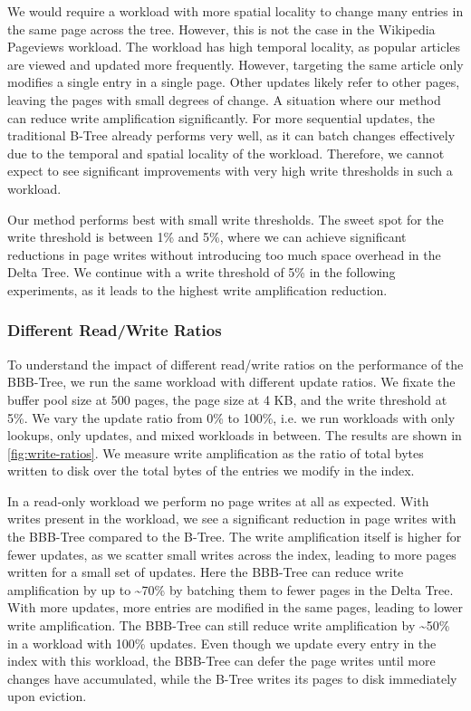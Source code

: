 We would require a workload with more spatial locality to change many entries in the same page across the tree.
However, this is not the case in the Wikipedia Pageviews workload.
The workload has high temporal locality, as popular articles are viewed and updated more frequently.
However, targeting the same article only modifies a single entry in a single page. 
Other updates likely refer to other pages, leaving the pages with small degrees of change.
A situation where our method can reduce write amplification significantly.
For more sequential updates, the traditional B-Tree already performs very well, as it can batch changes effectively due to the temporal and spatial locality of the workload.
Therefore, we cannot expect to see significant improvements with very high write thresholds in such a workload.

Our method performs best with small write thresholds.
The sweet spot for the write threshold is between 1\% and 5\%, where we can achieve significant reductions in page writes without introducing too much space overhead in the Delta Tree.
We continue with a write threshold of 5\% in the following experiments, as it leads to the highest write amplification reduction.

\subsubsection*{Different Read/Write Ratios}
To understand the impact of different read/write ratios on the performance of the BBB-Tree, we run the same workload with different update ratios.
We fixate the buffer pool size at 500 pages, the page size at 4 KB, and the write threshold at 5\%.
We vary the update ratio from 0\% to 100\%, i.e. we run workloads with only lookups, only updates, and mixed workloads in between.
The results are shown in \autoref{fig:write-ratios}.
We measure write amplification as the ratio of total bytes written to disk over the total bytes of the entries we modify in the index.

In a read-only workload we perform no page writes at all as expected.
With writes present in the workload, we see a significant reduction in page writes with the BBB-Tree compared to the B-Tree.
The write amplification itself is higher for fewer updates, as we scatter small writes across the index, leading to more pages written for a small set of updates.
Here the BBB-Tree can reduce write amplification by up to \textasciitilde70\% by batching them to fewer pages in the Delta Tree.
With more updates, more entries are modified in the same pages, leading to lower write amplification.
The BBB-Tree can still reduce write amplification by \textasciitilde50\% in a workload with 100\% updates.
Even though we update every entry in the index with this workload, the BBB-Tree can defer the page writes until more changes have accumulated, while the B-Tree writes its pages to disk immediately upon eviction.

